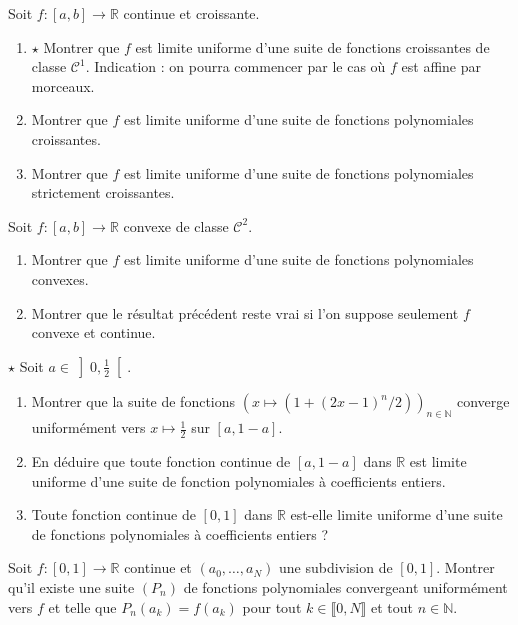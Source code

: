 \documentclass[french,a4paper]{article}
\newcommand{\N}{\mathbb{N}}
\newcommand{\R}{\mathbb{R}}
\theoremstyle{plain}
\theoremstyle{definition}
\theoremstyle{remark}
\begin{document}
\begin{ex}{}
	Soit $f:[a,b]\to\R$ continue et croissante.
	\begin{enumerate}
		\item $\star$ Montrer que $f$ est limite uniforme d'une suite de fonctions croissantes de classe $\mathcal{C}^1$. Indication : on pourra commencer par le cas où $f$ est affine par morceaux.
		\item Montrer que $f$ est limite uniforme d'une suite de fonctions polynomiales croissantes.
		\item Montrer que $f$ est limite uniforme d'une suite de fonctions polynomiales strictement croissantes.
	\end{enumerate}
\end{ex}

\begin{ex}{}
	Soit $f:[a,b]\to\R$ convexe de classe $\mathcal{C}^2$.
	\begin{enumerate}
		\item Montrer que $f$ est limite uniforme d'une suite de fonctions polynomiales convexes.
		\item Montrer que le résultat précédent reste vrai si l'on suppose seulement $f$ convexe et continue.
	\end{enumerate}
\end{ex}

\begin{ex}{$\star$}
	Soit $a\in\displaystyle\left]0,\frac{1}{2}\right[$.
	\begin{enumerate}
		\item Montrer que la suite de fonctions $\displaystyle\left(x\mapsto(1+(2x-1)^n/2)\right)_{n\in\N}$ converge uniformément vers $x\mapsto\displaystyle\frac12$ sur $[a,1-a]$.
		\item En déduire que toute fonction continue de $[a,1-a]$ dans $\R$ est limite uniforme d'une suite de fonction polynomiales à coefficients entiers.
		\item Toute fonction continue de $[0,1]$ dans $\R$ est-elle limite uniforme d'une suite de fonctions polynomiales à coefficients entiers ?
	\end{enumerate}
\end{ex}

\begin{ex}{}
	Soit $f:[0,1]\to\R$ continue et $(a_0,\ldots,a_N)$ une subdivision de $[0,1]$. Montrer qu'il existe une suite $(P_n)$ de fonctions polynomiales convergeant uniformément vers $f$ et telle que $P_n(a_k)=f(a_k)$ pour tout $k\in\llbracket 0,N\rrbracket$ et tout $n\in\N$.
\end{ex}
\end{document}
